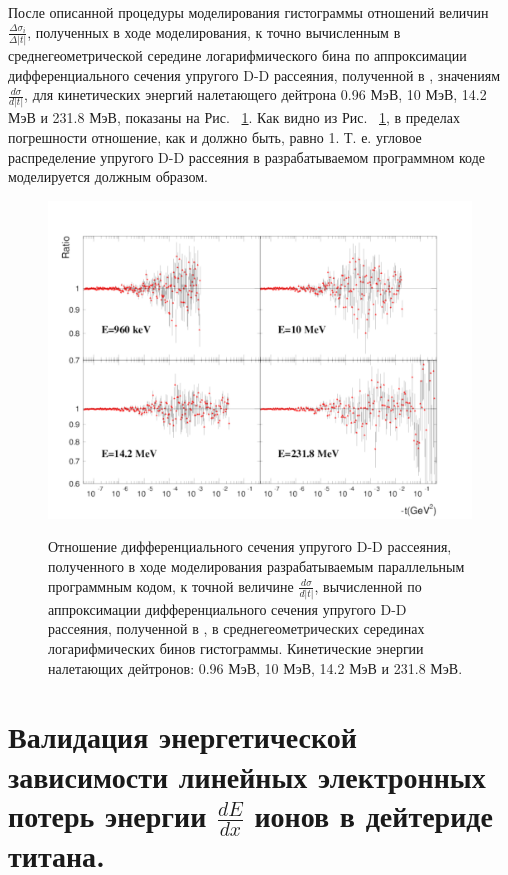\documentclass[a4paper,12pt]{article}
\begin{document}
\begin{large}
	После описанной процедуры моделирования гистограммы отношений величин $\frac{\Delta \sigma_i}{\Delta |t|}$, полученных в ходе моделирования, к точно вычисленным в среднегеометрической середине логарифмического бина по аппроксимации дифференциального сечения упругого D-D рассеяния, полученной в \cite{70/778-T}, значениям $\frac{d\sigma}{d|t|}$, для кинетических энергий налетающего дейтрона 0.96 МэВ, 10 МэВ, 14.2 МэВ и 231.8 МэВ, показаны на Рис. ~\ref{fig:CheckDDApproximationFillingBinsOfHistogram}.
	Как видно из Рис. ~\ref{fig:CheckDDApproximationFillingBinsOfHistogram}, в пределах погрешности отношение, как и должно быть, равно 1.
	Т. е. угловое распределение упругого D-D рассеяния в разрабатываемом программном коде моделируется должным образом.
	
\begin{figure}[ht]
  {
     \includegraphics[width=0.99\linewidth]{images/check_dd_approximation_filling_bins_of_histogram.pdf}
  }
  \caption{Отношение дифференциального сечения упругого D-D рассеяния, полученного в ходе моделирования разрабатываемым параллельным программным кодом, к точной величине $\frac{d\sigma}{d|t|}$, вычисленной по аппроксимации дифференциального сечения упругого D-D рассеяния, полученной в \cite{70/778-T}, в среднегеометрических серединах логарифмических бинов гистограммы. Кинетические энергии налетающих дейтронов: 0.96 МэВ, 10 МэВ, 14.2 МэВ и 231.8 МэВ.}
  \label{fig:CheckDDApproximationFillingBinsOfHistogram}
\end{figure}


\clearpage{}
\section{Валидация энергетической зависимости линейных электронных потерь энергии $\frac{dE}{dx}$ ионов в дейтериде титана.}
\label{ValdEdx}

\end{large}
\end{document}

